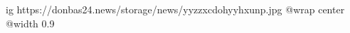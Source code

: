  
 
 
 
 

\ifcmt
  ig https://donbas24.news/storage/news/yyzzxcdohyyhxunp.jpg
  @wrap center
  @width 0.9
\fi
